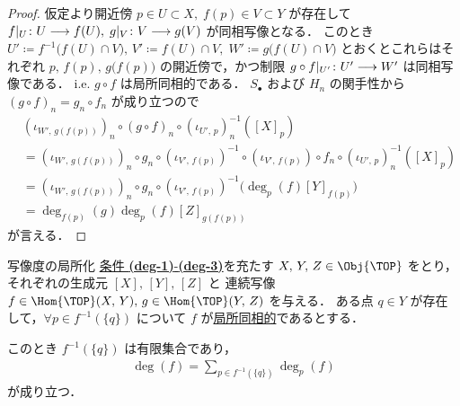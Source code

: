 \documentclass[algtopo_main]{subfiles}
\begin{document}
\begin{proof}
    仮定より開近傍 $p \in U \subset X,\; f(p) \in V \subset Y$ が存在して $f|_U \colon U \longrightarrow f(U),\; g|_V \colon V \longrightarrow g(V)$ が同相写像となる．
    このとき $U' \coloneqq f^{-1} \bigl( f(U) \cap V \bigr),\, V' \coloneqq f(U) \cap V,\; W' \coloneqq g \bigl( f(U) \cap V \bigr)$ とおくとこれらはそれぞれ $p,\, f(p),\, g \bigl( f(p) \bigr) $ の開近傍で，かつ制限 $g \circ f |_{U'} \colon U' \longrightarrow W'$ は同相写像である．
    i.e. $g \circ f$ は局所同相的である．
    $S_\bullet$ および $H_n$ の関手性から $(g \circ f)_n = g_n \circ f_n$ が成り立つので
    \begin{align}
        &(\iota_{W',\, g(f(p))})_n \circ (g\circ f)_n \circ (\iota_{U',\, p})_n^{-1} ([X]_p) \\
        &= (\iota_{W',\, g(f(p))})_n \circ g_n \circ (\iota_{V',\, f(p)})^{-1} \circ (\iota_{V',\, f(p)}) \circ f_n \circ (\iota_{U',\, p})_n^{-1} ([X]_p) \\
        &= (\iota_{W',\, g(f(p))})_n \circ g_n \circ (\iota_{V',\, f(p)})^{-1} \bigl( \deg_p(f) [Y]_{f(p)} \bigr) \\
        &= \deg_{f(p)}(g) \deg_p(f) [Z]_{g(f(p))}
    \end{align}
    が言える．
\end{proof}


\begin{mytheo}[label=thm:loc-degree]{写像度の局所化}
    \hyperref[def:degree]{条件 \textbf{\textsf{(deg-1)}}-\textbf{\textsf{(deg-3)}}}を充たす $X,\, Y,\, Z \in \Obj{\TOP}$ をとり，それぞれの生成元 $[X],\, [Y],\, [Z]$ と
    連続写像 $f \in \Hom{\TOP}(X,\, Y),\,  g \in \Hom{\TOP}(Y,\, Z)$ を与える．
    ある点 $q \in Y$ が存在して，$\forall p \in f^{-1}(\{q\})$ について $f$ が\hyperref[def:loc-degree]{局所同相的}であるとする．

    このとき $f^{-1}(\{q\})$ は有限集合であり，
    \begin{align}
        \deg (f) = \sum_{p \in f^{-1}(\{q\})} \deg_p(f)
    \end{align}
    が成り立つ．
\end{mytheo}
\end{document}
